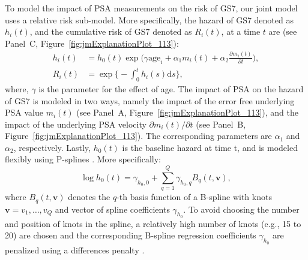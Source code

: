 To model the impact of PSA measurements on the risk of GS7, our joint model uses a relative risk sub-model. More specifically, the hazard of GS7 denoted as $h_i(t)$, and the cumulative risk of GS7 denoted as $R_i(t)$, at a time $t$ are (see Panel~C, Figure~\ref{fig:jmExplanationPlot_113}):
\begin{equation}
\label{eq:rel_risk_model}
\begin{split}
    h_i(t) &= h_0(t) \exp\Big(\gamma \mbox{age}_i +\alpha_{1} m_{i}(t) + \alpha_{2} \frac{\partial m_{i}(t)}{\partial {t}}\Big),\\
    R_i(t) &= \exp\Big\{-\int_0^{t} h_i(s)\mathrm{d}{s}\Big\},
    \end{split}
\end{equation}
where, $\gamma$ is the parameter for the effect of age. The impact of PSA on the hazard of GS7 is modeled in two ways, namely the impact of the error free underlying PSA value $m_{i}(t)$ (see Panel~A, Figure~\ref{fig:jmExplanationPlot_113}), and the impact of the underlying PSA velocity $\partial m_{i}(t)/\partial {t}$ (see Panel~B, Figure~\ref{fig:jmExplanationPlot_113}). The corresponding parameters are $\alpha_{1}$ and $\alpha_{2}$, respectively. Lastly, $h_0(t)$ is the baseline hazard at time t, and is modeled flexibly using P-splines \citep{eilers1996flexible}. More specifically:
\begin{equation*}
\log{h_0(t)} = \gamma_{h_0,0} + \sum_{q=1}^Q \gamma_{h_0,q} B_q(t, \boldsymbol{v}),
\end{equation*}
where $B_q(t, \boldsymbol{v})$ denotes the $q$-th basis function of a B-spline with knots $\boldsymbol{v} = v_1, \ldots, v_Q$ and vector of spline coefficients $\gamma_{h_0}$. To avoid choosing the number and position of knots in the spline, a relatively high number of knots (e.g., 15 to 20) are chosen and the corresponding B-spline regression coefficients $\gamma_{h_0}$ are penalized using a differences penalty \citep{eilers1996flexible}.


